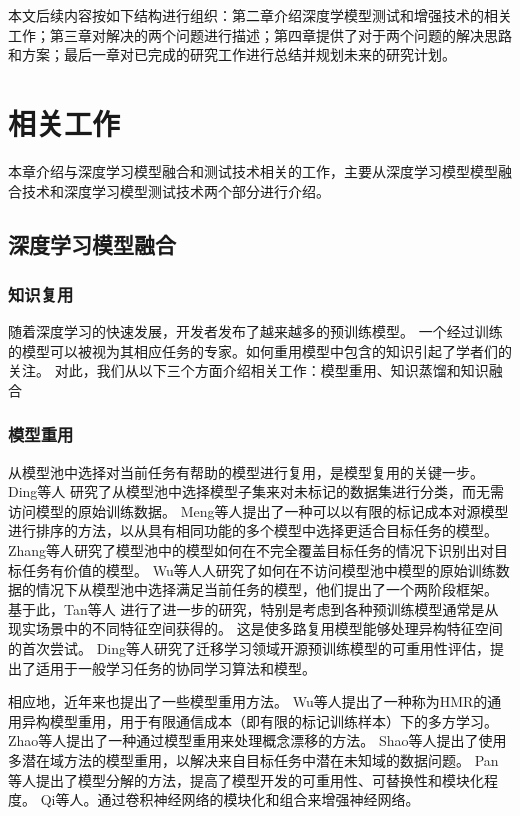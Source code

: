 \documentclass[fontset=macnew,UTF8]{article} %
\begin{document}
本文后续内容按如下结构进行组织：第二章介绍深度学模型测试和增强技术的相关工作；第三章对解决的两个问题进行描述；第四章提供了对于两个问题的解决思路和方案；最后一章对已完成的研究工作进行总结并规划未来的研究计划。

\section{相关工作}
本章介绍与深度学习模型融合和测试技术相关的工作，主要从深度学习模型模型融合技术和深度学习模型测试技术两个部分进行介绍。

\subsection{深度学习模型融合}
\subsubsection{知识复用}
随着深度学习的快速发展，开发者发布了越来越多的预训练模型。 一个经过训练的模型可以被视为其相应任务的专家\cite{yang2017deep}。如何重用模型中包含的知识引起了学者们的关注。 对此，我们从以下三个方面介绍相关工作：模型重用、知识蒸馏和知识融合
\subsubsection{模型重用}
 从模型池中选择对当前任务有帮助的模型进行复用，是模型复用的关键一步。 Ding等人\cite{ding2020boosting} 研究了从模型池中选择模型子集来对未标记的数据集进行分类，而无需访问模型的原始训练数据。 Meng等人\cite{meng2021measuring}提出了一种可以以有限的标记成本对源模型进行排序的方法，以从具有相同功能的多个模型中选择更适合目标任务的模型。Zhang等人\cite{zhang2021towards}研究了模型池中的模型如何在不完全覆盖目标任务的情况下识别出对目标任务有价值的模型。 Wu等人\cite{wu2021model}人研究了如何在不访问模型池中模型的原始训练数据的情况下从模型池中选择满足当前任务的模型，他们提出了一个两阶段框架。 基于此，Tan等人\cite{tan2022towards} 进行了进一步的研究，特别是考虑到各种预训练模型通常是从现实场景中的不同特征空间获得的。 这是使多路复用模型能够处理异构特征空间的首次尝试。 Ding等人\cite{ding2022pre}研究了迁移学习领域开源预训练模型的可重用性评估，提出了适用于一般学习任务的协同学习算法和模型。

相应地，近年来也提出了一些模型重用方法。 Wu等人\cite{wu2019heterogeneous}提出了一种称为HMR的通用异构模型重用，用于有限通信成本（即有限的标记训练样本）下的多方学习。 Zhao等人\cite{zhao2020handling}提出了一种通过模型重用来处理概念漂移的方法。 Shao等人\cite{shao2021towards}提出了使用多潜在域方法的模型重用，以解决来自目标任务中潜在未知域的数据问题。 Pan等人\cite{pan2022decomposing}提出了模型分解的方法，提高了模型开发的可重用性、可替换性和模块化程度。 Qi等人\cite{qi2022patching}。通过卷积神经网络的模块化和组合来增强神经网络。
\end{document}
